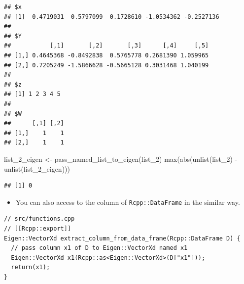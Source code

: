 \documentclass[
]{book}
\newenvironment{Shaded}{\begin{snugshade}}{\end{snugshade}}
\newcommand{\CommentTok}[1]{\textcolor[rgb]{0.56,0.35,0.01}{\textit{#1}}}
\newcommand{\FunctionTok}[1]{\textcolor[rgb]{0.00,0.00,0.00}{#1}}
\newcommand{\NormalTok}[1]{#1}
\newcommand{\OtherTok}[1]{\textcolor[rgb]{0.56,0.35,0.01}{#1}}
\newcommand{\SpecialCharTok}[1]{\textcolor[rgb]{0.00,0.00,0.00}{#1}}
\providecommand{\tightlist}{%
  \setlength{\itemsep}{0pt}\setlength{\parskip}{0pt}}
\begin{document}
\begin{Shaded}
\end{Shaded}

\begin{verbatim}
## $x
## [1]  0.4719031  0.5797099  0.1728610 -1.0534362 -0.2527136
## 
## $Y
##           [,1]       [,2]       [,3]      [,4]     [,5]
## [1,] 0.4645368 -0.8492838  0.5765778 0.2681390 1.059965
## [2,] 0.7205249 -1.5866628 -0.5665128 0.3031468 1.040199
## 
## $z
## [1] 1 2 3 4 5
## 
## $W
##      [,1] [,2]
## [1,]    1    1
## [2,]    1    1
\end{verbatim}

\begin{Shaded}
\begin{Highlighting}[]
\NormalTok{list\_2\_eigen }\OtherTok{\textless{}{-}} \FunctionTok{pass\_named\_list\_to\_eigen}\NormalTok{(list\_2)}
\FunctionTok{max}\NormalTok{(}\FunctionTok{abs}\NormalTok{(}\FunctionTok{unlist}\NormalTok{(list\_2) }\SpecialCharTok{{-}} \FunctionTok{unlist}\NormalTok{(list\_2\_eigen)))}
\end{Highlighting}
\end{Shaded}

\begin{verbatim}
## [1] 0
\end{verbatim}

\begin{itemize}
\tightlist
\item
  You can also access to the column of \texttt{Rcpp::DataFrame} in the similar way.
\end{itemize}

\begin{verbatim}
// src/functions.cpp
// [[Rcpp::export]]
Eigen::VectorXd extract_column_from_data_frame(Rcpp::DataFrame D) {
  // pass column x1 of D to Eigen::VectorXd named x1
  Eigen::VectorXd x1(Rcpp::as<Eigen::VectorXd>(D["x1"]));
  return(x1);
}
\end{verbatim}
\end{document}
